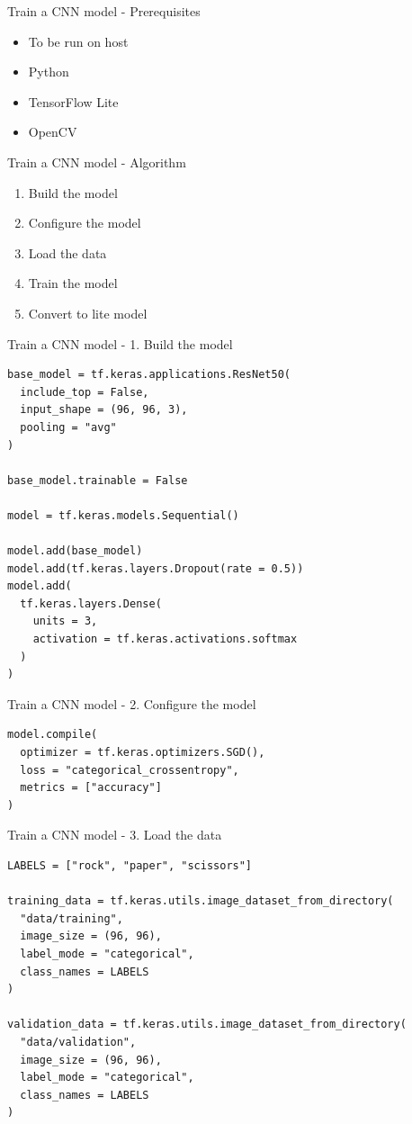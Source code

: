 \begin{frame}{Train a CNN model - Prerequisites}
  \begin{itemize}
	\item To be run on host
	\item Python
	\item TensorFlow Lite
	\item OpenCV
  \end{itemize}
\end{frame}

\begin{frame}{Train a CNN model - Algorithm}
  \begin{enumerate}
	\item Build the model
	\item Configure the model
	\item Load the data
	\item Train the model
	\item Convert to lite model
  \end{enumerate}
\end{frame}

\begin{frame}[fragile]{Train a CNN model - 1. Build the model}
  \lstset{basicstyle=\ttfamily\small, numbers=left, columns=fullflexible}
  \begin{lstlisting}
base_model = tf.keras.applications.ResNet50(
  include_top = False,
  input_shape = (96, 96, 3),
  pooling = "avg"
)

base_model.trainable = False

model = tf.keras.models.Sequential()

model.add(base_model)
model.add(tf.keras.layers.Dropout(rate = 0.5))
model.add(
  tf.keras.layers.Dense(
    units = 3,
    activation = tf.keras.activations.softmax
  )
)
  \end{lstlisting}
\end{frame}

\begin{frame}[fragile]{Train a CNN model - 2. Configure the model}
  \lstset{basicstyle=\ttfamily\small, numbers=left, columns=fullflexible}
  \begin{lstlisting}
model.compile(
  optimizer = tf.keras.optimizers.SGD(),
  loss = "categorical_crossentropy",
  metrics = ["accuracy"]
)
  \end{lstlisting}
\end{frame}

\begin{frame}[fragile]{Train a CNN model - 3. Load the data}
  \lstset{basicstyle=\ttfamily\small, numbers=left, columns=fullflexible}
  \begin{lstlisting}
LABELS = ["rock", "paper", "scissors"]

training_data = tf.keras.utils.image_dataset_from_directory(
  "data/training",
  image_size = (96, 96),
  label_mode = "categorical",
  class_names = LABELS
)

validation_data = tf.keras.utils.image_dataset_from_directory(
  "data/validation",
  image_size = (96, 96),
  label_mode = "categorical",
  class_names = LABELS
)
  \end{lstlisting}
\end{frame}

